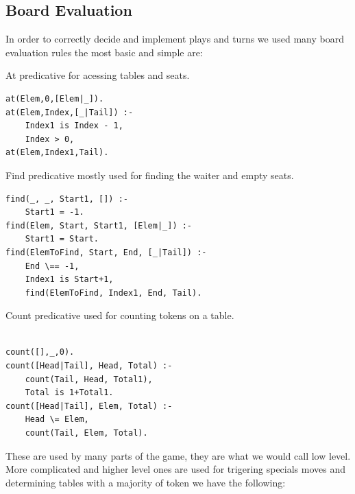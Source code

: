 \documentclass[a4paper]{article}
\begin{document}
\subsection{Board Evaluation}

In order to correctly decide and implement plays and turns we used many board evaluation rules the most basic and simple are:

        \begin{listing}[H]
            \caption{At predicative for acessing tables and seats.}
            \label{Codigo:cod_at}
            \begin{verbatim}
at(Elem,0,[Elem|_]).
at(Elem,Index,[_|Tail]) :-
    Index1 is Index - 1,
    Index > 0,
at(Elem,Index1,Tail).

    \end{verbatim}

    \end{listing}


        \begin{listing}[H]
        \caption{Find predicative mostly used for finding the waiter and empty seats.}
        \label{Codigo:cod_find}
        \begin{verbatim}
find(_, _, Start1, []) :-
    Start1 = -1.
find(Elem, Start, Start1, [Elem|_]) :-
    Start1 = Start.
find(ElemToFind, Start, End, [_|Tail]) :-
    End \== -1,
    Index1 is Start+1,
    find(ElemToFind, Index1, End, Tail).

        \end{verbatim}

        \end{listing}


        \begin{listing}[H]
        \caption{Count predicative used for counting tokens on a table.}
        \label{Codigo:cod_count}
        \begin{verbatim}

count([],_,0).
count([Head|Tail], Head, Total) :-
    count(Tail, Head, Total1),
    Total is 1+Total1.
count([Head|Tail], Elem, Total) :-
    Head \= Elem,
    count(Tail, Elem, Total).

        \end{verbatim}

        \end{listing}


These are used by many parts of the game, they are what we would call low level.
More complicated and higher level ones are used for trigering specials moves and determining tables
with a majority of token we have the following:
\end{document}

